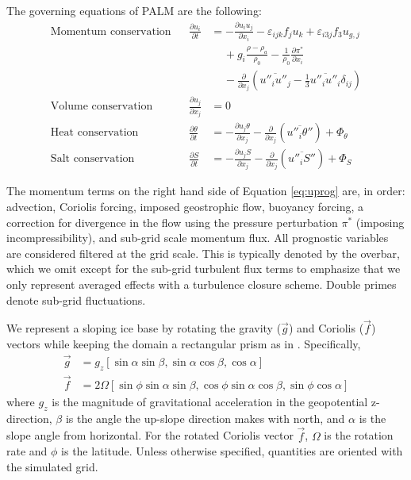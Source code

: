 \documentclass[tc, manuscript]{copernicus}
\begin{document}
The governing equations of PALM are the following:\\
\begin{align}
    \textrm{Momentum conservation} & &
        \frac{\partial u_i}{\partial t} &= 
        -\frac{\partial u_i u_j}{\partial x_i}
        -\varepsilon_{ijk} f_j u_k 
        + \varepsilon_{i3j} f_3 u_{g,j}\nonumber\\
     &&& \quad \, + g_i \frac{\rho - \rho_a}{\rho_0} 
        - \frac{1}{\rho_0}\frac{\partial \pi^*}{\partial x_i} \nonumber\\
     &&& \quad \, - \frac{\partial}{\partial x_j}\left(\overline{u''_i u''_j} 
        - \frac{1}{3}\overline{u''_i u''_i}\delta_{ij}\right) \label{eq:uprog}\\
    \textrm{Volume conservation} & &
        \frac{\partial u_j}{\partial x_j} &= 0\label{eq:volconserv}\\
    \textrm{Heat conservation} & &
        \frac{\partial \theta}{\partial t} &= 
        -\frac{\partial u_j \theta}{\partial x_j} 
        - \frac{\partial}{\partial x_j}\left(\overline{u''_i \theta''}\right) 
        + \Phi_{\theta}\label{eq:ptprog}\\
    \textrm{Salt conservation} & &
        \frac{\partial S}{\partial t} &= 
        -\frac{\partial u_j S}{\partial x_j} 
        - \frac{\partial}{\partial x_j}\left(\overline{u''_i S''}\right) 
        + \Phi_{S}\label{eq:saprog}
\end{align}

The momentum terms on the right hand side of Equation \ref{eq:uprog} are, in order: advection, Coriolis forcing, imposed geostrophic flow, buoyancy forcing, a correction for divergence in the flow using the pressure perturbation $\pi^*$ (imposing incompressibility), and sub-grid scale momentum flux. All prognostic variables are considered filtered at the grid scale. This is typically denoted by the overbar, which we omit except for the sub-grid turbulent flux terms to emphasize that we only represent averaged effects with a turbulence closure scheme. Double primes denote sub-grid fluctuations. 

We represent a sloping ice base by rotating the gravity ($\vec{g}$) and Coriolis ($\vec{f}$) vectors while keeping the domain a rectangular prism as in \citet{vreugdenhil_stratification_2019}. 
Specifically, 
\begin{align}
	\vec{g} &= g_z [\sin \alpha \sin \beta, \sin \alpha \cos \beta,\cos \alpha]\label{eq:g}\\
    \vec{f} &= 2 \Omega [\sin \phi \sin \alpha \sin \beta,\cos \phi \sin \alpha \cos \beta,\sin \phi \cos \alpha]\label{eq:f}
\end{align}
where $g_z$ is the magnitude of gravitational acceleration in the geopotential z-direction, $\beta$ is the angle the up-slope direction makes with north, and $\alpha$ is the slope angle from horizontal. For the rotated Coriolis vector $\vec{f}$, $\Omega$ is the rotation rate and $\phi$ is the latitude. Unless otherwise specified, quantities are oriented with the simulated grid.
\end{document}
